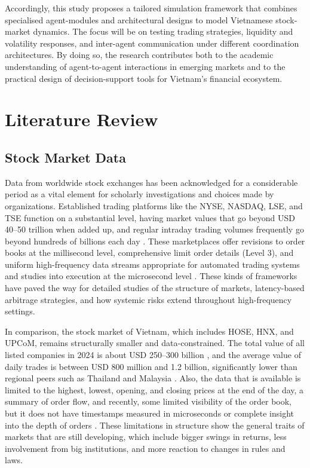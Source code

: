 \documentclass{ieeeaccess}
\begin{document}
Accordingly, this study proposes a tailored simulation framework that combines specialised agent-modules and architectural designs to model Vietnamese stock-market dynamics. The focus will be on testing trading strategies, liquidity and volatility responses, and inter-agent communication under different coordination architectures. By doing so, the research contributes both to the academic understanding of agent-to-agent interactions in emerging markets and to the practical design of decision-support tools for Vietnam’s financial ecosystem.



\section{Literature Review}
\label{sec:Literature Review}

\subsection{Stock Market Data}
Data from worldwide stock exchanges has been acknowledged for a considerable period as a vital element for scholarly investigations and choices made by organizations. Established trading platforms like the NYSE, NASDAQ, LSE, and TSE function on a substantial level, having market values that go beyond USD 40–50 trillion when added up, and regular intraday trading volumes frequently go beyond hundreds of billions each day \cite{WorldFederation2024}. These marketplaces offer revisions to order books at the millisecond level, comprehensive limit order details (Level 3), and uniform high-frequency data streams appropriate for automated trading systems and studies into execution at the microsecond level \cite{Jones2019HFT}. These kinds of frameworks have paved the way for detailed studies of the structure of markets, latency-based arbitrage strategies, and how systemic risks extend throughout high-frequency settings.

In comparison, the stock market of Vietnam, which includes HOSE, HNX, and UPCoM, remains structurally smaller and data-constrained. The total value of all listed companies in 2024 is about USD 250–300 billion \cite{HOSE2024Report}, and the average value of daily trades is between USD 800 million and 1.2 billion, significantly lower than regional peers such as Thailand and Malaysia \cite{ADB2024}. Also, the data that is available is limited to the highest, lowest, opening, and closing prices at the end of the day, a summary of order flow, and recently, some limited visibility of the order book, but it does not have timestamps measured in microseconds or complete insight into the depth of orders \cite{Nguyen2022Microstructure}. These limitations in structure show the general traits of markets that are still developing, which include bigger swings in returns, less involvement from big institutions, and more reaction to changes in rules and laws.
\end{document}
